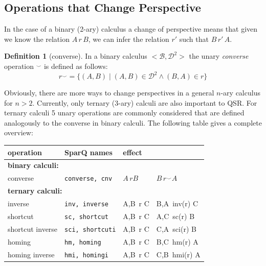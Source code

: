 \documentclass[headsepline]{scrreprt}
\theoremstyle{definition}
\newtheorem{defn}{Definition}
\newcommand{\engine}{SparQ}
\begin{document}
\subsection{Operations that Change Perspective}
In the case of a binary (2-ary) calculus a change of perspective means that given we know the relation $A\, r \, B$, we can infer the relation $r'$ such that $B\, r'\, A$.

\begin{defn}[converse]
	In a binary calculus $<\mathcal{B},\mathcal{D}^2>$ the unary {\em converse} operation $^{\smile}$ is defined as follows:
	$$ r^{\smile} = \{ (A,B)\; |\; (A,B) \in \mathcal{D}^2 \wedge (B,A) \in r \}$$
\end{defn}

Obviously, there are more ways to change perspectives in a general $n$-ary calculus for $n>2$. Currently, only ternary (3-ary) calculi are also important to QSR. For ternary calculi 5 unary operations are commonly considered that are defined analogously to the converse in  binary calculi. The following table gives a complete overview:

\begin{center}
\begin{tabular}{|lll@{ $\leadsto$ }l|} \hline
{\bf operation} & {\bf \engine{} names} & \multicolumn{2}{l|}{{\bf effect}}\\ \hline \hline
%
\multicolumn{4}{|l|}{\bf binary calculi:}\\
converse & {\tt converse, cnv} & $A\, r B$ & $B\, r^{\smile} A$\\[1ex] \hline
%
\multicolumn{4}{|l|}{\bf ternary calculi:}\\
%
inverse & {\tt inv, inverse} & A,B\, r  C & B,A\, inv(r) C\\
shortcut & {\tt sc, shortcut} & A,B\, r  C & A,C\, sc(r) B\\
shortcut inverse & {\tt sci, shortcuti} & A,B\, r  C & C,A\, sci(r) B\\
homing & {\tt hm, homing} & A,B\, r C & B,C\, hm(r) A\\
homing inverse & {\tt hmi, homingi} & A,B\, r  C & C,B\, hmi(r) A\\ \hline
\end{tabular}
\end{center}
\end{document}
